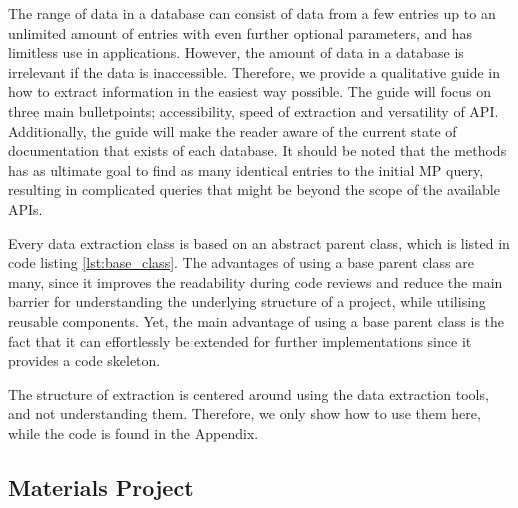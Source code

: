 The range of data in a database can consist of data from a few entries up to an unlimited amount of entries with even further optional parameters, and has limitless use in applications. However, the amount of data in a database is irrelevant if the data is inaccessible. Therefore, we provide a qualitative guide in how to extract information in the easiest way possible. The guide will focus on three main bulletpoints; accessibility, speed of extraction and versatility of API. Additionally, the guide will make the reader aware of the current state of documentation that exists of each database. It should be noted that the methods has as ultimate goal to find as many identical entries to the initial MP query, resulting in complicated queries that might be beyond the scope of the available APIs.

Every data extraction class is based on an abstract parent class, which is listed in code listing \ref{lst:base_class}. The advantages of using a base parent class are many, since it improves the readability during code reviews and reduce the main barrier for understanding the underlying structure of a project, while utilising reusable components. Yet, the main advantage of using a base parent class is the fact that it can effortlessly be extended for further implementations since it provides a code skeleton.

The structure of extraction is centered around using the data extraction tools, and not understanding them. Therefore, we only show how to use them here, while the code is found in the Appendix.





\subsection{Materials Project}
\label{ssec:materialsproject}

